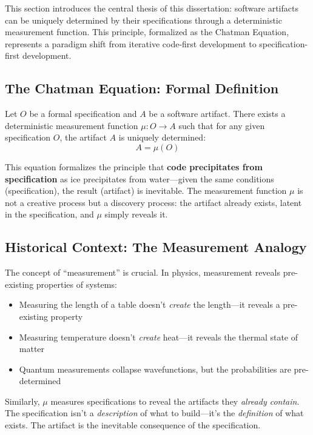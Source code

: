 This section introduces the central thesis of this dissertation: software artifacts can be uniquely determined by their specifications through a deterministic measurement function. This principle, formalized as the Chatman Equation, represents a paradigm shift from iterative code-first development to specification-first development.

\subsection{The Chatman Equation: Formal Definition}

\begin{definition}
    Let \(O\) be a formal specification and \(A\) be a software artifact. There exists a deterministic measurement function \(\mu: O \rightarrow A\) such that for any given specification \(O\), the artifact \(A\) is uniquely determined:
    \begin{equation}
        A = \mu(O)
    \end{equation}
\end{definition}

This equation formalizes the principle that \textbf{code precipitates from specification} as ice precipitates from water---given the same conditions (specification), the result (artifact) is inevitable. The measurement function \(\mu\) is not a creative process but a discovery process: the artifact already exists, latent in the specification, and \(\mu\) simply reveals it.

\subsection{Historical Context: The Measurement Analogy}

The concept of ``measurement'' is crucial. In physics, measurement reveals pre-existing properties of systems:
\begin{itemize}
    \item Measuring the length of a table doesn't \textit{create} the length---it reveals a pre-existing property
    \item Measuring temperature doesn't \textit{create} heat---it reveals the thermal state of matter
    \item Quantum measurements collapse wavefunctions, but the probabilities are pre-determined
\end{itemize}

Similarly, \(\mu\) measures specifications to reveal the artifacts they \textit{already contain}. The specification isn't a \textit{description} of what to build---it's the \textit{definition} of what exists. The artifact is the inevitable consequence of the specification.

